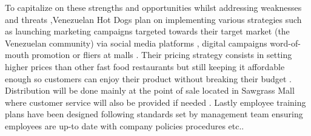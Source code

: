 To capitalize on these strengths and opportunities whilst addressing weaknesses and threats ,Venezuelan Hot Dogs plan on implementing various strategies such as launching marketing campaigns targeted towards their target market (the Venezuelan community) via social media platforms , digital campaigns word-of-mouth promotion or fliers at malls . Their pricing strategy consists in setting higher prices than other fast food restaurants but still keeping it affordable enough so customers can enjoy their product without breaking their budget . Distribution will be done mainly at the point of sale located in Sawgrass Mall where customer service will also be provided if needed . Lastly employee training plans have been designed following standards set by management team ensuring employees are up-to date with company policies procedures etc..  

